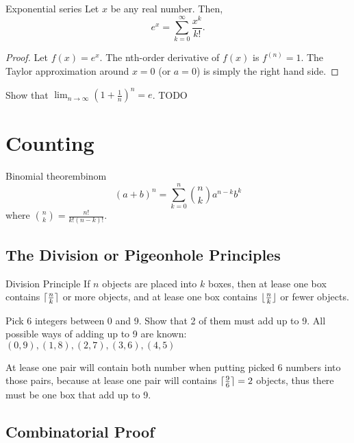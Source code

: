 \documentclass[11pt,a4paper,fleqn]{article}
\numberwithin{equation}{section}
\DeclarePairedDelimiter\ceil{\lceil}{\rceil}
\DeclarePairedDelimiter\floor{\lfloor}{\rfloor}
\begin{document}
\begin{fact}{Exponential series}{}
    Let $x$ be any real number. Then,
    \[
    e^x = \sum_{k=0}^{\infty}\frac{x^k}{k!}.
    \]
    \tcblower
    \begin{proof}
        Let $f(x) = e^x$.
        The nth-order derivative of $f(x)$ is $f^{(n)}=1$.
        The Taylor approximation around $x=0$ (or $a=0$) is simply the right hand side.
    \end{proof}
\end{fact}

\begin{exec}
    Show that $\lim_{n\rightarrow\infty}(1+\frac{1}{n})^n=e$.
    \tcblower
    TODO
\end{exec}

\section{Counting}
\begin{fact}{Binomial theorem}{binom}
    \[
    (a+b)^n = \sum_{k=0}^n \binom{n}{k} a^{n-k}b^k
    \]
    where $\binom{n}{k} = \frac{n!}{k!(n-k)!}$.
\end{fact}

\subsection{The Division or Pigeonhole Principles}

\begin{fact}{Division Principle}{}
    If $n$ objects are placed into $k$ boxes,
    then at lease one box contains $\ceil{\frac{n}{k}}$ or more objects,
    and at lease one box contains $\floor{\frac{n}{k}}$ or fewer objects.
\end{fact}

\begin{exec}
    Pick 6 integers between 0 and 9. Show that 2 of them must add up to 9.
    \tcblower
    All possible ways of adding up to 9 are known:
    $(0,9),(1,8),(2,7),(3,6),(4,5)$
    
    At lease one pair will contain both number when putting picked 6 numbers into those pairs, because at lease one pair will contains $\ceil{\frac{9}{6}}=2$ objects, thus there must be one box that add up to 9.
\end{exec}

\subsection{Combinatorial Proof}
\end{document}
